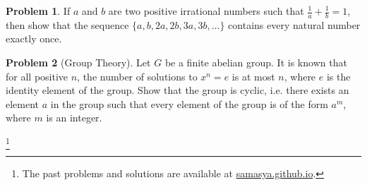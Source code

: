 \documentclass[10pt,a4paper,notitlepage]{article}
\theoremstyle{definition}
\newtheorem{prob}{Problem}
\newcommand\blfootnote[1]{%
  \begingroup
  \renewcommand\thefootnote{}\footnote{#1}%
  \addtocounter{footnote}{-1}%
  \endgroup
}
\begin{document}
\begin{prob}
If $a$ and $b$ are two positive irrational numbers such that $\frac{1}{a} + \frac{1}{b} = 1$, then show that the sequence $\{a, b, 2a, 2b, 3a, 3b, \ldots\}$ contains every natural number exactly once.
\end{prob}

\begin{prob}[Group Theory]
Let $G$ be a finite abelian group. It is known that for all positive $n$, the number of solutions to $x^n=e$ is at most $n$, where $e$ is the identity element of the group. Show that the group is cyclic, i.e. there exists an element $a$ in the group such that every element of the group is of the form $a^m$, where $m$ is an integer.
\end{prob}

\blfootnote{The past problems and solutions are available at \href{http://samasya.github.io}{samasya.github.io}.}
\end{document}
